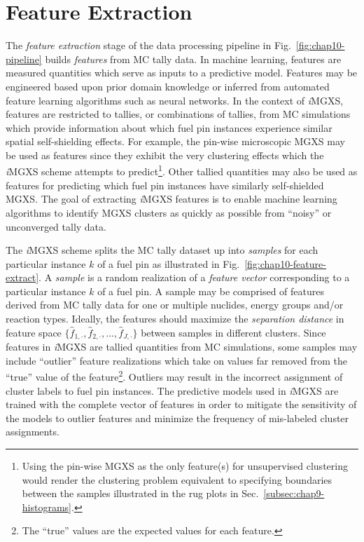 \section{Feature Extraction}
\label{sec:chap10-feature-extract}

The \textit{feature extraction} stage of the data processing pipeline in Fig.~\ref{fig:chap10-pipeline} builds \textit{features} from \ac{MC} tally data. In machine learning, features are measured quantities which serve as inputs to a predictive model. Features may be engineered based upon prior domain knowledge or inferred from automated feature learning algorithms such as neural networks. In the context of \textit{i}\ac{MGXS}, features are restricted to tallies, or combinations of tallies, from \ac{MC} simulations which provide information about which fuel pin instances experience similar spatial self-shielding effects. For example, the pin-wise microscopic \ac{MGXS} may be used as features since they exhibit the very clustering effects which the \textit{i}\ac{MGXS} scheme attempts to predict\footnote{Using the pin-wise \ac{MGXS} as the only feature(s) for unsupervised clustering would render the clustering problem equivalent to specifying boundaries between the samples illustrated in the rug plots in Sec.~\ref{subsec:chap9-histograms}.}. Other tallied quantities may also be used as features for predicting which fuel pin instances have similarly self-shielded \ac{MGXS}. The goal of extracting \textit{i}\ac{MGXS} features is to enable machine learning algorithms to identify \ac{MGXS} clusters as quickly as possible from ``noisy'' or unconverged tally data.

The \textit{i}\ac{MGXS} scheme splits the \ac{MC} tally dataset up into \textit{samples} for each particular instance $k$ of a fuel pin as illustrated in Fig.~\ref{fig:chap10-feature-extract}. A \textit{sample} is a random realization of a \textit{feature vector} corresponding to a particular instance $k$ of a fuel pin. A sample may be comprised of features derived from \ac{MC} tally data for one or multiple nuclides, energy groups and/or reaction types. Ideally, the features should maximize the \textit{separation distance} in feature space $\{\hat{f}_{1,\cdot}, \hat{f}_{2,\cdot}, \dots, \hat{f}_{J,\cdot}\}$ between samples in different clusters. Since features in \textit{i}\ac{MGXS} are tallied quantities from \ac{MC} simulations, some samples may include ``outlier'' feature realizations which take on values far removed from the ``true'' value of the feature\footnote{The ``true'' values are the expected values for each feature.}. Outliers may result in the incorrect assignment of cluster labels to fuel pin instances. The predictive models used in \textit{i}\ac{MGXS} are trained with the complete vector of features in order to mitigate the sensitivity of the models to outlier features and minimize the frequency of mis-labeled cluster assignments.

